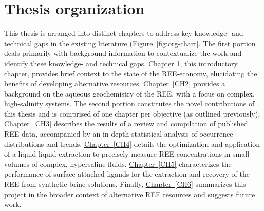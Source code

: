 \section{Thesis organization}
This thesis is arranged into distinct chapters to address key knowledge- and technical gaps in the existing literature (Figure~\ref{fig:org-chart}.
The first portion deals primarily with background information to contextualize the work and identify these knowledge- and technical gaps.
Chapter 1, this introductory chapter, provides brief context to the state of the REE-economy, elucidating the benefits of developing alternative resources.
\hyperref[CH2]{Chapter~\ref*{CH2}} provides a background on the aqueous geochemistry of the REE, with a focus on complex, high-salinity systems.
The second portion constitutes the novel contributions of this thesis and is comprised of one chapter per objective (as outlined previously).
\hyperref[CH3]{Chapter~\ref*{CH3}} describes the results of a review and compilation of published REE data, accompanied by an in depth statistical analysis of occurrence distributions and trends.
\hyperref[CH4]{Chapter~\ref*{CH4}} details the optimization and application of a liquid-liquid extraction to precisely measure REE concentrations in small volumes of complex, hypersaline fluids.
\hyperref[CH5]{Chapter~\ref*{CH5}} characterizes the performance of surface attached ligands for the extraction and recovery of the REE from synthetic brine solutions.
Finally, \hyperref[CH6]{Chapter~\ref*{CH6}} summarizes this project in the broader context of alternative REE resources and suggests future work.

